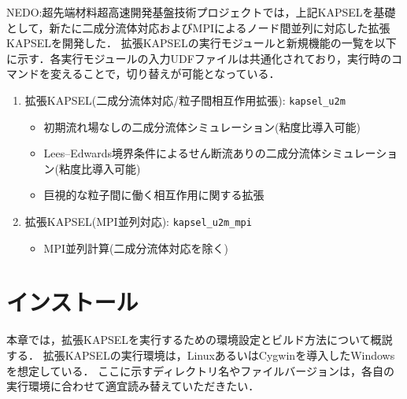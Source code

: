 \documentclass[pdflatex,a4paper,10pt,ja=standard]{bxjsarticle}
\begin{document}
NEDO:超先端材料超高速開発基盤技術プロジェクトでは，上記KAPSELを基礎として，新たに二成分流体対応およびMPIによるノード間並列に対応した拡張KAPSELを開発した．
拡張KAPSELの実行モジュールと新規機能の一覧を以下に示す．各実行モジュールの入力UDFファイルは共通化されており，実行時のコマンドを変えることで，切り替えが可能となっている．
\begin{enumerate}
    \item 拡張KAPSEL(二成分流体対応/粒子間相互作用拡張): \verb|kapsel_u2m|
    \begin{itemize}
        \item 初期流れ場なしの二成分流体シミュレーション(粘度比導入可能)
        \item Lees--Edwards境界条件によるせん断流ありの二成分流体シミュレーション(粘度比導入可能)
        \item 巨視的な粒子間に働く相互作用に関する拡張
    \end{itemize}
    \item 拡張KAPSEL(MPI並列対応): \verb|kapsel_u2m_mpi|
    \begin{itemize}
        \item MPI並列計算(二成分流体対応を除く)
    \end{itemize}
\end{enumerate}

\section{インストール}
本章では，拡張KAPSELを実行するための環境設定とビルド方法について概説する．
拡張KAPSELの実行環境は，LinuxあるいはCygwinを導入したWindowsを想定している．
ここに示すディレクトリ名やファイルバージョンは，各自の実行環境に合わせて適宜読み替えていただきたい．
\end{document}
